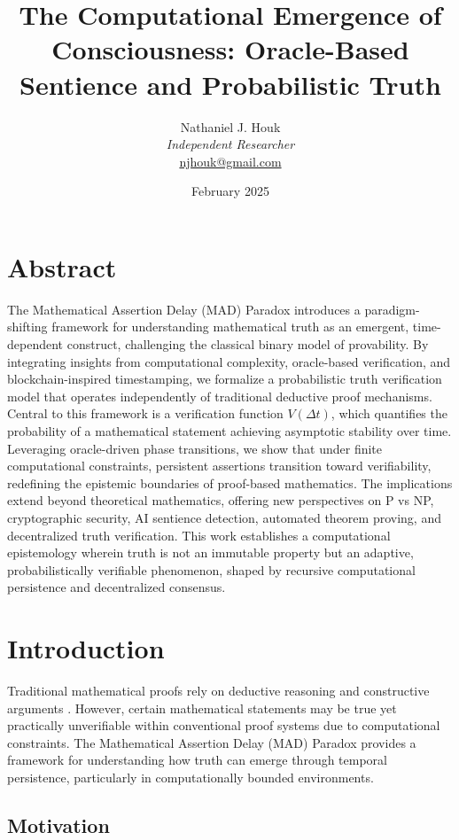 \documentclass[11pt]{article}
\title{The Computational Emergence of Consciousness: Oracle-Based Sentience and Probabilistic Truth}
\author{Nathaniel J. Houk\\
\textit{Independent Researcher}\\
\href{mailto:njhouk@gmail.com}{njhouk@gmail.com}}
\date{February 2025}
\begin{document}
\maketitle

\section*{Abstract}

The Mathematical Assertion Delay (MAD) Paradox introduces a paradigm-shifting framework for understanding mathematical truth as an emergent, time-dependent construct, challenging the classical binary model of provability. By integrating insights from computational complexity, oracle-based verification, and blockchain-inspired timestamping, we formalize a probabilistic truth verification model that operates independently of traditional deductive proof mechanisms. Central to this framework is a verification function $V(\Delta t)$, which quantifies the probability of a mathematical statement achieving asymptotic stability over time. Leveraging oracle-driven phase transitions, we show that under finite computational constraints, persistent assertions transition toward verifiability, redefining the epistemic boundaries of proof-based mathematics. The implications extend beyond theoretical mathematics, offering new perspectives on P vs NP, cryptographic security, AI sentience detection, automated theorem proving, and decentralized truth verification. This work establishes a computational epistemology wherein truth is not an immutable property but an adaptive, probabilistically verifiable phenomenon, shaped by recursive computational persistence and decentralized consensus.

\section{Introduction}

Traditional mathematical proofs rely on deductive reasoning and constructive arguments \cite{Cook1971, Godel1931}. However, certain mathematical statements may be true yet practically unverifiable within conventional proof systems due to computational constraints. The Mathematical Assertion Delay (MAD) Paradox provides a framework for understanding how truth can emerge through temporal persistence, particularly in computationally bounded environments.

\subsection{Motivation}
\end{document}
